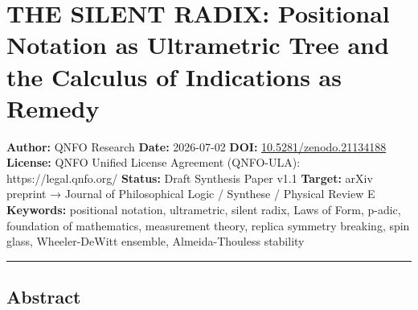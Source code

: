 \documentclass[
]{article}
\author{}
\date{}
\begin{document}
\section{THE SILENT RADIX: Positional Notation as Ultrametric Tree and
the Calculus of Indications as
Remedy}\label{the-silent-radix-positional-notation-as-ultrametric-tree-and-the-calculus-of-indications-as-remedy}

\textbf{Author:} QNFO Research \textbar{} \textbf{Date:} 2026-07-02
\textbar{} \textbf{DOI:}
\href{https://doi.org/10.5281/zenodo.21134188}{10.5281/zenodo.21134188}
\textbar{} \textbf{License:} QNFO Unified License Agreement (QNFO-ULA):
https://legal.qnfo.org/ \textbf{Status:} Draft Synthesis Paper v1.1
\textbf{Target:} arXiv preprint → Journal of Philosophical Logic /
Synthese / Physical Review E \textbf{Keywords:} positional notation,
ultrametric, silent radix, Laws of Form, p-adic, foundation of
mathematics, measurement theory, replica symmetry breaking, spin glass,
Wheeler-DeWitt ensemble, Almeida-Thouless stability

\begin{center}\rule{0.5\linewidth}{0.5pt}\end{center}

\subsection{Abstract}\label{abstract}
\end{document}
